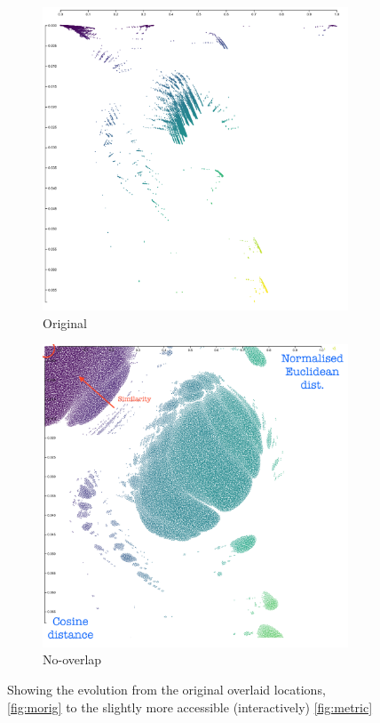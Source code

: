 \begin{figure}[H]
\begin{subfigure}[t]{.5\textwidth}
  \centering
  \includegraphics[width=\textwidth]{fig/metric-1.png}
  \caption{Original}
  \label{fig:morig}
\end{subfigure}%
\begin{subfigure}[t]{.5\textwidth}
\includegraphics[width=\textwidth]{fig/metric.png}
\caption{No-overlap}
\label{fig:metric}
\end{subfigure}
\caption{Showing the evolution from the original overlaid locations, \autoref{fig:morig} to the slightly more accessible (interactively) \autoref{fig:metric}}
\end{figure}

